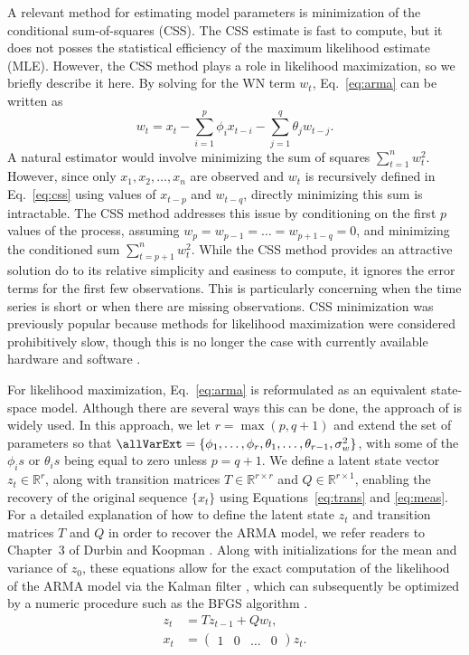 A relevant method for estimating model parameters is minimization of the conditional sum-of-squares (CSS).
The CSS estimate is fast to compute, but it does not posses the statistical efficiency of the maximum likelihood estimate (MLE).
However, the CSS method plays a role in likelihood maximization, so we briefly describe it here.
By solving for the WN term $w_t$, Eq.~\ref{eq:arma} can be written as
\begin{equation}
w_t = x_t - \sum_{i = 1}^p \phi_i x_{t - i} - \sum_{j = 1}^q \theta_j w_{t-j}. \label{eq:css}
\end{equation}
A natural estimator would involve minimizing the sum of squares $\sum_{t = 1}^n w_t^2$.
However, since only $x_1, x_2, \ldots, x_n$ are observed and $w_{t}$ is recursively defined in Eq.~\ref{eq:css} using values of $x_{t-p}$ and $w_{t-q}$, directly minimizing this sum is intractable.
The CSS method addresses this issue by conditioning on the first $p$ values of the process, assuming $w_p = w_{p-1} = \ldots = w_{p+1-q} = 0$, and minimizing the conditioned sum $\sum_{t = p+1}^n w_t^2$.
While the CSS method provides an attractive solution do to its relative simplicity and easiness to compute, it ignores the error terms for the first few observations.
This is particularly concerning when the time series is short or when there are missing observations.
CSS minimization was previously popular because methods for likelihood maximization were considered prohibitively slow, though this is no longer the case with currently available hardware and software \cite{ripley2002}.

For likelihood maximization, Eq.~\ref{eq:arma} is reformulated as an equivalent state-space model.
Although there are several ways this can be done, the approach of \cite{gardner1980} is widely used.
In this approach, we let $r = \max(p, q + 1)$ and extend the set of parameters so that $\allVarExt = \{\phi_1, \allowbreak \ldots, \allowbreak \phi_r, \allowbreak \theta_1, \allowbreak \ldots, \allowbreak \theta_{r-1}, \allowbreak \sigma^2_w\}$, with some of the $\phi_is$ or $\theta_is$ being equal to zero unless $p = q + 1$.
We define a latent state vector $z_t \in \mathbb{R}^{r}$, along with transition matrices $T\in \mathbb{R}^{r\times r}$ and $Q \in \mathbb{R}^{r\times 1}$, enabling the recovery of the original sequence $\{x_t\}$ using Equations~\ref{eq:trans} and \ref{eq:meas}.
For a detailed explanation of how to define the latent state $z_t$ and transition matrices $T$ and $Q$ in order to recover the ARMA model, we refer readers to Chapter~3 of Durbin and Koopman \cite{durbin12}.
Along with initializations for the mean and variance of $z_0$, these equations allow for the exact computation of the likelihood of the ARMA model via the Kalman filter \cite{kalman60}, which can subsequently be optimized by a numeric procedure such as the BFGS algorithm \cite{fletcher00}.
\begin{align}
  z_t &= Tz_{t - 1} + Qw_t, \label{eq:trans} \\
  x_t &= \begin{pmatrix} 1 & 0 & \ldots & 0\end{pmatrix} z_t. \label{eq:meas}
\end{align}


